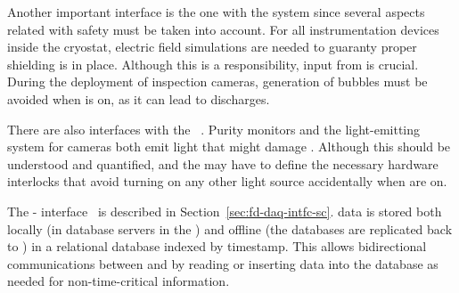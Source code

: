 Another important interface is the one with the  system \cite{bib:docdb6787} since several aspects related with safety must be taken into account. 
For all instrumentation devices inside the cryostat, electric field simulations are needed to guaranty proper shielding is in place.
Although this is a  responsibility, input from  is crucial.
During the deployment of inspection cameras, generation of bubbles must be avoided when  is on, as it can lead to discharges.

There are also interfaces with the ~\cite{bib:docdb6730}. Purity monitors and the light-emitting system for cameras both emit light that might damage .
Although this should be understood and quantified,  and the \single {} may have to define the necessary hardware interlocks
that avoid turning on any other light source accidentally when  are on.

The - interface~\cite{bib:docdb6790} is described in Section~\ref{sec:fd-daq-intfc-sc}. %
 data is stored both locally (in  database servers in the
) and offline (the databases are replicated back to \fnal)
in a relational database indexed by timestamp.
This allows bidirectional communications between  and  by
reading or inserting data into the database as needed for non-time-critical information.  




